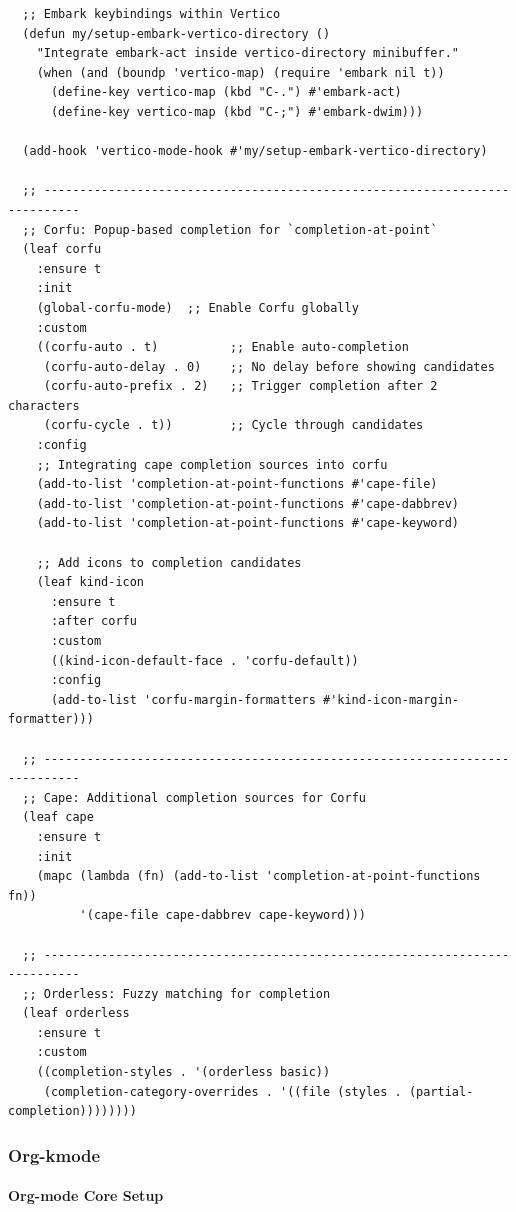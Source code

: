 \documentclass[11pt]{article}
\begin{document}
\begin{verbatim}
  ;; Embark keybindings within Vertico
  (defun my/setup-embark-vertico-directory ()
    "Integrate embark-act inside vertico-directory minibuffer."
    (when (and (boundp 'vertico-map) (require 'embark nil t))
      (define-key vertico-map (kbd "C-.") #'embark-act)
      (define-key vertico-map (kbd "C-;") #'embark-dwim)))

  (add-hook 'vertico-mode-hook #'my/setup-embark-vertico-directory)

  ;; ---------------------------------------------------------------------------
  ;; Corfu: Popup-based completion for `completion-at-point`
  (leaf corfu
    :ensure t
    :init
    (global-corfu-mode)  ;; Enable Corfu globally
    :custom
    ((corfu-auto . t)          ;; Enable auto-completion
     (corfu-auto-delay . 0)    ;; No delay before showing candidates
     (corfu-auto-prefix . 2)   ;; Trigger completion after 2 characters
     (corfu-cycle . t))        ;; Cycle through candidates
    :config
    ;; Integrating cape completion sources into corfu
    (add-to-list 'completion-at-point-functions #'cape-file)
    (add-to-list 'completion-at-point-functions #'cape-dabbrev)
    (add-to-list 'completion-at-point-functions #'cape-keyword)

    ;; Add icons to completion candidates
    (leaf kind-icon
      :ensure t
      :after corfu
      :custom
      ((kind-icon-default-face . 'corfu-default))
      :config
      (add-to-list 'corfu-margin-formatters #'kind-icon-margin-formatter)))

  ;; ---------------------------------------------------------------------------
  ;; Cape: Additional completion sources for Corfu
  (leaf cape
    :ensure t
    :init
    (mapc (lambda (fn) (add-to-list 'completion-at-point-functions fn))
          '(cape-file cape-dabbrev cape-keyword)))

  ;; ---------------------------------------------------------------------------
  ;; Orderless: Fuzzy matching for completion
  (leaf orderless
    :ensure t
    :custom
    ((completion-styles . '(orderless basic))
     (completion-category-overrides . '((file (styles . (partial-completion))))))))
\end{verbatim}
\subsubsection{Org-kmode}
\label{sec:org8a67ad8}
\paragraph{Org-mode Core Setup}
\label{sec:org44fd2c7}
\end{document}
